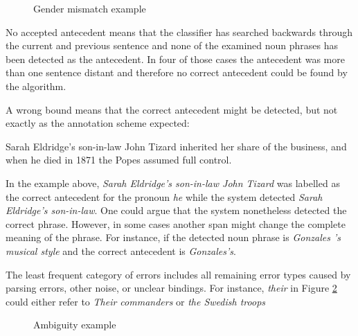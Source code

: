 \begin{figure}[h]
\centering
\caption{Gender mismatch example}
	\label{figure:wrongGenderError}
\end{figure}

No accepted antecedent means that the classifier has searched backwards through the current and previous sentence and none of the examined noun phrases has been detected as the antecedent. In four of those cases the antecedent was more than one sentence distant and therefore no correct antecedent could be found by the algorithm. 

A wrong bound means that the correct antecedent might be detected, but not exactly as the annotation scheme expected:
\begin{addmargin}[25pt]{25pt}
Sarah Eldridge's son-in-law John Tizard inherited her share of the business, and when he died in 1871 the Popes assumed full control.
\end{addmargin}
In the example above, \textit{Sarah Eldridge's son-in-law John Tizard} was labelled as the correct antecedent for the pronoun \textit{he} while the system detected \textit{Sarah Eldridge's son-in-law}. One could argue that the system nonetheless detected the correct phrase. However, in some cases another span might change the complete meaning of the phrase. For instance, if the detected noun phrase is \textit{Gonzales 's musical style} and the correct antecedent is \textit{Gonzales's}.

The least frequent category of errors includes all remaining error types caused by parsing errors, other noise, or unclear bindings. For instance, \textit{their} in Figure \ref{figure:otherError} could either refer to \textit{Their commanders} or \textit{the Swedish troops}

\begin{figure}[h]
\centering
\caption{Ambiguity example}
	\label{figure:otherError}
\end{figure}


